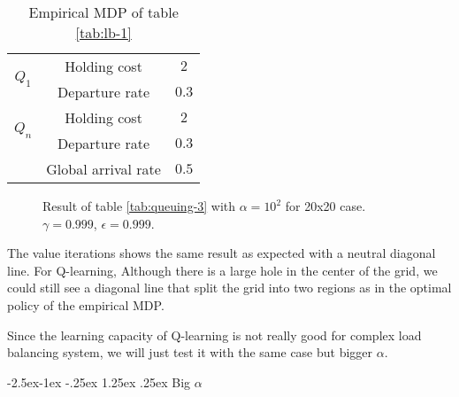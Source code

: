 \documentclass[
  a4paper, xcolor = usenames,dvipsnames]{article}
\makeatletter
\renewcommand\paragraph{\@startsection{paragraph}{4}{\z@}%
  {-2.5ex\@plus -1ex \@minus -.25ex}%
  {1.25ex \@plus .25ex}%
  {\normalfont\normalsize\bfseries}}
\theoremstyle{definition}
\theoremstyle{definition}
\theoremstyle{definition}
\theoremstyle{definition}
\theoremstyle{remark}
\makeatother
\begin{document}
\begin{table}[!htbp]
\caption{Empirical MDP of table \ref{tab:lb-1}}
\begin{center}
\begin{tabular}{c c c}
    \hline
    \multirow{2}{*}{$Q_{1}$} &  Holding cost & $2$ \\
    & Departure rate & $0.3$ \\
    \cline{2-3}
    \multirow{2}{*}{$Q_{n}$} &  Holding cost & $2$ \\
    & Departure rate & $0.3$ \\
    \cline{2-3}
    & Global arrival rate & $0.5$ \\
    \hline
\end{tabular}
\end{center}
\label{tab:mdp-lb-1}
\end{table}



\begin{figure}

{\centering {}

}

\caption{Result of table \ref{tab:queuing-3} with \(\alpha = 10^{2}\) for 20x20 case. \(\gamma = 0.999\), \(\epsilon = 0.999\).}\label{fig:20x20-lb-1}
\end{figure}

The value iterations shows the same result as expected with a neutral diagonal line. For Q-learning, Although there is a large hole in the center of the grid, we could still see a diagonal line that split the grid into two regions as in the optimal policy of the empirical MDP.

Since the learning capacity of Q-learning is not really good for complex load balancing system, we will just test it with the same case but bigger \(\alpha\).

\hypertarget{big-alpha-1}{%
\paragraph{\texorpdfstring{Big \(\alpha\)}{Big \textbackslash alpha}}\label{big-alpha-1}}
\end{document}
